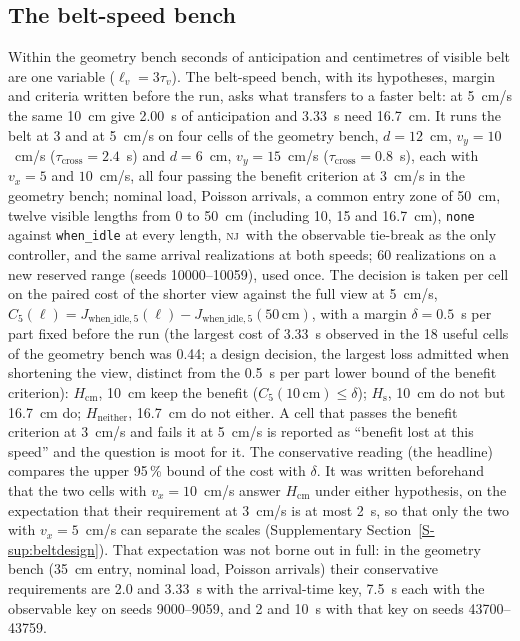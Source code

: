 \documentclass[11pt,a4paper]{article}
\newcommand{\nj}{\textsc{nj}}
\newcommand{\tcross}{\tau_{\mathrm{cross}}}
\newcommand{\tv}{\tau_{v}}
\newcommand{\lv}{\ell_{v}}
\newcommand{\supsec}[1]{Supplementary Section~\ref{S-#1}}
\begin{document}
\subsection{The belt-speed bench}\label{sec:beltdesign}
Within the geometry bench seconds of anticipation and centimetres of visible belt are one
variable ($\lv=3\tv$). The belt-speed bench, with its hypotheses, margin and criteria
written before the run, asks what transfers to a faster belt: at 5~cm/s the same 10~cm give
2.00~s of anticipation and 3.33~s need 16.7~cm. It runs the belt at 3 and at 5~cm/s on four
cells of the geometry bench, $d=12$~cm, $v_y=10$~cm/s ($\tcross=2.4$~s) and $d=6$~cm,
$v_y=15$~cm/s ($\tcross=0.8$~s), each with $v_x=5$ and $10$~cm/s, all four passing the
benefit criterion at 3~cm/s in the geometry bench; nominal load, Poisson arrivals, a common
entry zone of 50~cm, twelve visible lengths from 0 to 50~cm (including 10, 15 and
16.7~cm), \texttt{none} against \texttt{when\_idle} at every length, \nj\ with the
observable tie-break as the only controller, and the same arrival realizations at both
speeds; 60 realizations on a new reserved range (seeds 10000--10059), used once. The decision is taken per cell
on the paired cost of the shorter view against the full view at 5~cm/s,
$C_5(\ell)=J_{\mathrm{when\_idle},5}(\ell)-J_{\mathrm{when\_idle},5}(50\,\mathrm{cm})$,
with a margin $\delta=0.5$~s per part fixed before the run (the largest cost of 3.33~s
observed in the 18 useful cells of the geometry bench was 0.44; a design decision, the
largest loss admitted when shortening the view, distinct from the 0.5~s per part lower
bound of the benefit criterion): $H_{\mathrm{cm}}$, 10~cm keep the benefit
($C_5(10\,\mathrm{cm})\le\delta$); $H_{\mathrm{s}}$, 10~cm do not but 16.7~cm do;
$H_{\mathrm{neither}}$, 16.7~cm do not either. A cell that passes the benefit criterion at
3~cm/s and fails it at 5~cm/s is reported as ``benefit lost at this speed'' and the
question is moot for it. The conservative reading (the headline) compares the upper
95\,\% bound of the cost with $\delta$. It was written beforehand that the two cells with
$v_x=10$~cm/s answer $H_{\mathrm{cm}}$ under either hypothesis, on the expectation that their
requirement at 3~cm/s is at most 2~s, so that only the two with $v_x=5$~cm/s can separate
the scales (\supsec{sup:beltdesign}). That expectation was not borne out in full: in the
geometry bench (35~cm entry, nominal load, Poisson arrivals) their conservative
requirements are 2.0 and 3.33~s with the arrival-time key, 7.5~s each with the observable
key on seeds 9000--9059, and 2 and 10~s with that key on seeds 43700--43759.
\end{document}
